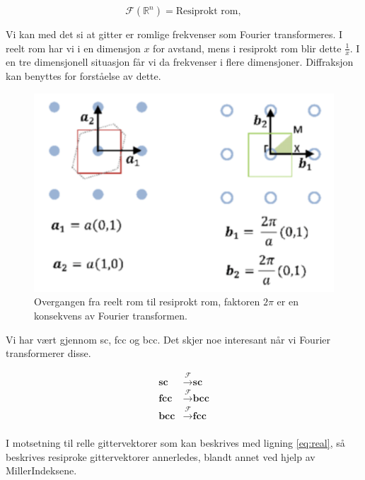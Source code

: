 \begin{equation}
    \mathscr{F}(\mathbb{R}^n) = \text{Resiprokt rom},
\end{equation}

Vi kan med det si at gitter er romlige frekvenser som Fourier transformeres. I reelt rom har vi i en dimensjon $x$ for avstand, mens i resiprokt rom blir dette $\frac{1}{x}$. I en tre dimensjonell situasjon får vi da frekvenser i flere dimensjoner. Diffraksjon kan benyttes for forståelse av dette. 

\begin{figure}[!htb]
    \centering
    \includegraphics[scale=0.4]{Bilder/SamtaleTema4/resip.png}
    \caption{Overgangen fra reelt rom til resiprokt rom, faktoren $2\pi$ er en konsekvens av Fourier transformen.}
    \label{fig:resip}
\end{figure}

Vi har vært gjennom sc, fcc og bcc. Det skjer noe interesant når vi Fourier transformerer disse.

\begin{equation*}
    \begin{split}
        \textbf{sc} &\xrightarrow{\mathscr{F}} \textbf{sc}\\
        \textbf{fcc} &\xrightarrow{\mathscr{F}} \textbf{bcc}\\
        \textbf{bcc} &\xrightarrow{\mathscr{F}} \textbf{fcc}\\
    \end{split}
\end{equation*}

I motsetning til relle gittervektorer som kan beskrives med ligning \ref{eq:real}, så beskrives resiproke gittervektorer annerledes, blandt annet ved hjelp av MillerIndeksene.

